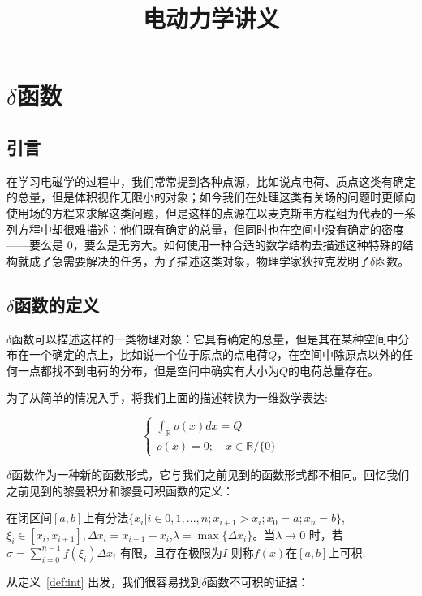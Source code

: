 \documentclass[lang=cn,10pt,newtx,bibend=biber,device=pad]{elegantbook}
\title{电动力学讲义}
\begin{document}
	
\maketitle
\frontmatter

\tableofcontents

\mainmatter


\chapter{$\delta$函数}

\section{引言}

在学习电磁学的过程中，我们常常提到各种点源，比如说点电荷、质点这类有确定的总量，但是体积视作无限小的对象；如今我们在处理这类有关场的问题时更倾向使用场的方程来求解这类问题，但是这样的点源在以麦克斯韦方程组为代表的一系列方程中却很难描述：他们既有确定的总量，但同时也在空间中没有确定的密度——要么是 0，要么是无穷大。如何使用一种合适的数学结构去描述这种特殊的结构就成了急需要解决的任务，为了描述这类对象，物理学家狄拉克发明了$\delta$函数。

\section{$\delta$函数的定义}

$\delta$函数可以描述这样的一类物理对象：它具有确定的总量，但是其在某种空间中分布在一个确定的点上，比如说一个位于原点的点电荷$Q$，在空间中除原点以外的任何一点都找不到电荷的分布，但是空间中确实有大小为$Q $的电荷总量存在。

为了从简单的情况入手，将我们上面的描述转换为一维数学表达\cite{gelfand1968generalized}:

\begin{equation}
\begin{cases}
\int_{\mathbb{R}}\rho(x)dx = Q \\
\rho(x) = 0; \quad x \in \mathbb{R}/\{0\}
\end{cases}
\end{equation}

$\delta$函数作为一种新的函数形式，它与我们之前见到的函数形式都不相同。回忆我们之前见到的黎曼积分和黎曼可积函数的定义：

\begin{definition}[可积函数]\label{def:int}
    在闭区间$[a,b]$上有分法$\{x_i|i\in {0,1,...,n};x_{i+1}>x_i;x_0 =a;x_n=b\}$,$\xi_i \in [x_{i},x_{i+1}],\Delta x_i = x_{i+1} - x_i$,$\lambda = \max \{ \Delta x_i \}$。当$\lambda \rightarrow0$ 时，若$\sigma = \sum_{i=0}^{n-1}f(\xi_i)\Delta x_i$ 有限，且存在极限为$I$ 则称$f(x)$在$[a,b]$上可积.
\end{definition}
从定义~\ref{def:int} 出发，我们很容易找到$\delta$函数不可积的证据：
\end{document}
